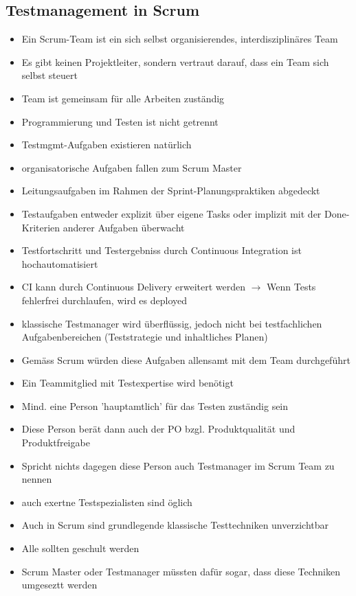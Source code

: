 \documentclass{report}
\theoremstyle{definition}
\theoremstyle{example}
\begin{document}
\subsection{Testmanagement in Scrum}
\begin{itemize}
   \item Ein Scrum-Team ist ein sich selbst organisierendes, interdisziplinäres Team
   \item Es gibt keinen Projektleiter, sondern vertraut darauf, dass ein Team sich selbst steuert
   \item Team ist gemeinsam für alle Arbeiten zuständig
   \item Programmierung und Testen ist nicht getrennt
   \item Testmgmt-Aufgaben existieren natürlich
   \item organisatorische Aufgaben fallen zum Scrum Master
   \item Leitungsaufgaben im Rahmen der Sprint-Planungspraktiken abgedeckt
   \item Testaufgaben entweder explizit über eigene Tasks oder implizit mit der Done-Kriterien anderer Aufgaben überwacht
   \item Testfortschritt und Testergebniss durch Continuous Integration ist hochautomatisiert
   \item CI kann durch Continuous Delivery erweitert werden $\rightarrow$ Wenn Tests fehlerfrei durchlaufen, wird es deployed
   \item klassische Testmanager wird überflüssig, jedoch nicht bei testfachlichen Aufgabenbereichen (Teststrategie und inhaltliches Planen)
   \item Gemäss Scrum würden diese Aufgaben allensamt mit dem Team durchgeführt
   \item Ein Teammitglied mit Testexpertise wird benötigt
   \item Mind. eine Person 'hauptamtlich' für das Testen zuständig sein
   \item Diese Person berät dann auch der PO bzgl. Produktqualität und Produktfreigabe
   \item Spricht nichts dagegen diese Person auch Testmanager im Scrum Team zu nennen
   \item auch exertne Testspezialisten sind öglich
   \item Auch in Scrum sind grundlegende klassische Testtechniken unverzichtbar
   \item Alle sollten geschult werden
   \item Scrum Master oder Testmanager müssten dafür sogar, dass diese Techniken umgeseztt werden
\end{itemize}
\end{document}
